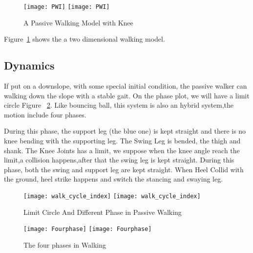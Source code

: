 \begin{figure}[!htbp]
  \begin{center}
    \leavevmode
    \ifpdf
      \texttt{[image: PWI]}
    \else
      \texttt{[image: PWI]}
    \fi
    \caption{A Passive Walking Model with Knee}
    \label{fig:passivekneewalker}
\end{center}
\end{figure}


Figure~\ref{fig:passivekneewalker} shows the a two dimensional walking model.
\subsection*{Dynamics}
If put on a downslope, with some special initial condition, the passive walker can walking down the slope with a stable gait.
On the phase plot, we will have a limit circle Figure ~\ref{fig:fourphaselimitcycle}.
Like bouncing ball, this system is also an hybrid system,the motion include four phases\citep{Chen2007}.
\begin{itemize}
During this phase, the support leg (the blue one) is kept straight and there is no knee bending with the supporting leg.
The Swing Leg is bended, the thigh and shank.
The Knee Joints has a limit, we suppose when the knee angle reach the limit,a collision happens,after that the swing leg is kept straight.
During this phase, both the swing and support leg are kept straight.
When Heel Collid with the ground, heel strike happens and switch the stancing and swaying leg.
\end{itemize}

\begin{figure}[!htbp]
  \begin{center}
    \leavevmode
    \ifpdf
      \texttt{[image: walk\_cycle\_index]}
    \else
      \texttt{[image: walk\_cycle\_index]}
    \fi
    \caption{Limit Circle And Different Phase in Passive Walking}
    \label{fig:fourphaselimitcycle}
\end{center}
\end{figure}


\begin{figure}[!htbp]
  \begin{center}
    \leavevmode
    \ifpdf
      \texttt{[image: Fourphase]}
    \else
      \texttt{[image: Fourphase]}
    \fi
    \caption{The four phases in Walking}
    \label{fig:fwalkingphase}
\end{center}
\end{figure}

